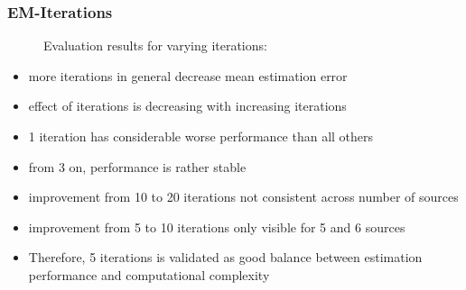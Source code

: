 \subsubsection{EM-Iterations}

% 	       
% 	       

% 	

\begin{figure}[H]
    \setlength\figureheight{7cm}
    \small
    \setlength\figurewidth{\textwidth}
	\centering
	\begin{tikzpicture}
	    \footnotesize
	    
	    
	\end{tikzpicture}
	
	\caption[Evaluation results for varying  iterations]{Evaluation results for varying  iterations: }
	\label{fig:trial1}
\end{figure}


\begin{itemize}
\item more iterations in general decrease mean estimation error
\item effect of iterations is decreasing with increasing iterations
\item 1 iteration has considerable worse performance than all others
\item from 3 on, performance is rather stable
\item improvement from 10 to 20 iterations not consistent across number of sources 
\item improvement from 5 to 10 iterations only visible for 5 and 6 sources
\item Therefore, 5 iterations is validated as good balance between estimation performance and computational complexity
\end{itemize}
